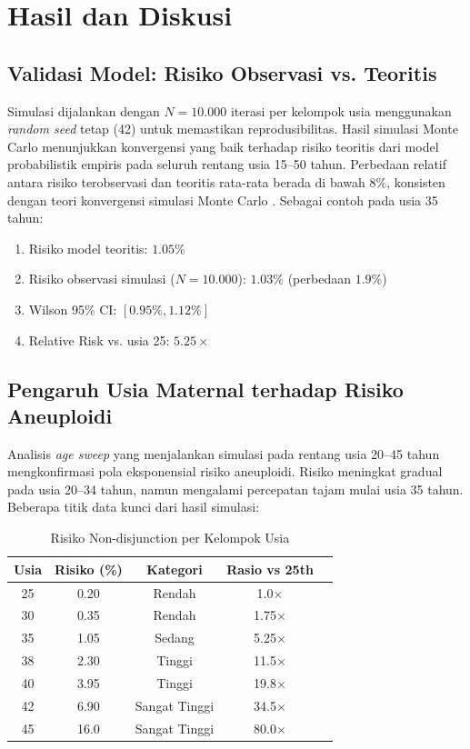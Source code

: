 \documentclass[10pt,a4paper,twocolumn]{article}
\begin{document}
\section{Hasil dan Diskusi}

\subsection{Validasi Model: Risiko Observasi vs. Teoritis}

Simulasi dijalankan dengan $N = 10.000$ iterasi per kelompok usia menggunakan
\textit{random seed} tetap (42) untuk memastikan reprodusibilitas.
Hasil simulasi Monte Carlo menunjukkan konvergensi yang baik terhadap risiko
teoritis dari model probabilistik empiris pada seluruh rentang usia 15--50 tahun.
Perbedaan relatif antara risiko terobservasi dan teoritis rata-rata berada di bawah
$8\%$, konsisten dengan teori konvergensi simulasi Monte Carlo \cite{metropolis1949}.
Sebagai contoh pada usia 35 tahun:

\begin{enumerate}[leftmargin=*,noitemsep,topsep=2pt]
    \item Risiko model teoritis: $1.05\%$
    \item Risiko observasi simulasi ($N=10.000$): $1.03\%$ (perbedaan $1.9\%$)
    \item Wilson 95\% CI: $[0.95\%, 1.12\%]$
    \item Relative Risk vs. usia 25: $\mathbf{5.25\times}$
\end{enumerate}

\subsection{Pengaruh Usia Maternal terhadap Risiko Aneuploidi}

Analisis \textit{age sweep} yang menjalankan simulasi pada rentang usia 20--45 tahun
mengkonfirmasi pola eksponensial risiko aneuploidi. Risiko meningkat gradual pada
usia 20--34 tahun, namun mengalami percepatan tajam mulai usia 35 tahun.
Beberapa titik data kunci dari hasil simulasi:

\begin{table}[H]
\centering
\caption{Risiko Non-disjunction per Kelompok Usia}
\label{tab:risk}
\scriptsize
\begin{tabular}{@{}ccccc@{}}
\toprule
\textbf{Usia} & \textbf{Risiko (\%)} & \textbf{Kategori} & \textbf{Rasio vs 25th} \\
\midrule
25 & 0.20 & Rendah   & 1.0$\times$ \\
30 & 0.35 & Rendah   & 1.75$\times$ \\
35 & 1.05 & Sedang   & 5.25$\times$ \\
38 & 2.30 & Tinggi   & 11.5$\times$ \\
40 & 3.95 & Tinggi   & 19.8$\times$ \\
42 & 6.90 & Sangat Tinggi & 34.5$\times$ \\
45 & 16.0 & Sangat Tinggi & 80.0$\times$ \\
\bottomrule
\end{tabular}
\end{table}
\end{document}
